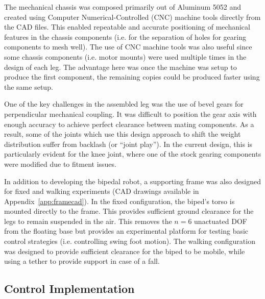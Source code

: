 The mechanical chassis was composed primarily out of Aluminum 5052 and created using Computer Numerical-Controlled (CNC) machine tools directly from the CAD files. This enabled repeatable and accurate positioning of mechanical features in the chassis components (i.e. for the separation of holes for gearing components to mesh well). The use of CNC machine tools was also useful since some chassis components (i.e. motor mounts) were used multiple times in the design of each leg. The advantage here was once the machine was setup to produce the first component, the remaining copies could be produced faster using the same setup. 

One of the key challenges in the assembled leg was the use of bevel gears for perpendicular mechanical coupling. It was difficult to position the gear axis with enough accuracy to achieve perfect clearance between mating components. As a result, some of the joints which use this design approach to shift the weight distribution suffer from backlash (or ``joint play''). In the current design, this is particularly evident for the knee joint, where one of the stock gearing components were modified due to fitment issues. 

In addition to developing the bipedal robot, a supporting frame was also designed for fixed and walking experiments (CAD drawings available in Appendix~\ref{app:framecad}). In the fixed configuration, the biped's torso is mounted directly to the frame. This provides sufficient ground clearance for the legs to remain suspended in the air. This removes the $n = 6$ unactuated DOF from the floating base but provides an experimental platform for testing basic control strategies (i.e. controlling swing foot motion). The walking configuration was designed to provide sufficient clearance for the biped to be mobile, while using a tether to provide support in case of a fall. 

\subsection{Control Implementation} %
\label{sub:control_implementation}

